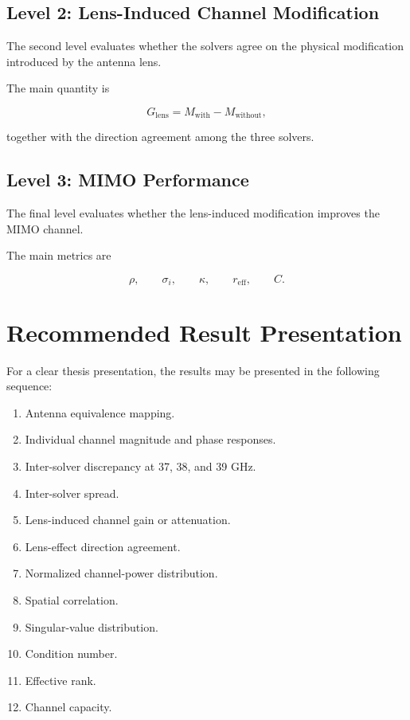 \documentclass[11pt,a4paper]{article}
\begin{document}
\subsection{Level 2: Lens-Induced Channel Modification}

The second level evaluates whether the solvers agree on the physical modification introduced by the antenna lens.

The main quantity is

\[
G_{\mathrm{lens}}
=
M_{\mathrm{with}}
-
M_{\mathrm{without}},
\]

together with the direction agreement among the three solvers.

\subsection{Level 3: MIMO Performance}

The final level evaluates whether the lens-induced modification improves the MIMO channel.

The main metrics are

\[
\rho,
\qquad
\sigma_i,
\qquad
\kappa,
\qquad
r_{\mathrm{eff}},
\qquad
C.
\]

\section{Recommended Result Presentation}

For a clear thesis presentation, the results may be presented in the following sequence:

\begin{enumerate}[leftmargin=0.8cm]
    \item Antenna equivalence mapping.
    \item Individual channel magnitude and phase responses.
    \item Inter-solver discrepancy at 37, 38, and 39 GHz.
    \item Inter-solver spread.
    \item Lens-induced channel gain or attenuation.
    \item Lens-effect direction agreement.
    \item Normalized channel-power distribution.
    \item Spatial correlation.
    \item Singular-value distribution.
    \item Condition number.
    \item Effective rank.
    \item Channel capacity.
\end{enumerate}
\end{document}
